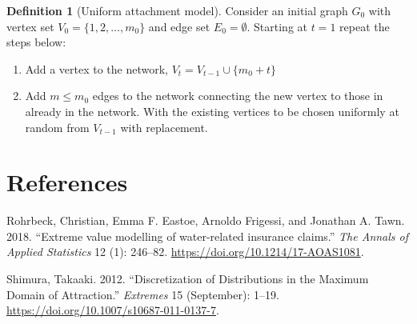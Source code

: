 \documentclass[
  10pt,
  a4paper,
]{scrreprt}
\providecommand{\tightlist}{%
  \setlength{\itemsep}{0pt}\setlength{\parskip}{0pt}}\usepackage{longtable,booktabs,array}
\newlength{\cslhangindent}
\newlength{\cslentryspacingunit} %
\newenvironment{CSLReferences}[2] %
 {%
  \setlength{\parindent}{0pt}
  \ifodd #1
  \let\oldpar\par
  \def\par{\hangindent=\cslhangindent\oldpar}
  \fi
  \setlength{\parskip}{#2\cslentryspacingunit}
 }%
 {}
\theoremstyle{definition}
\newtheorem{definition}{Definition}[section]
\theoremstyle{remark}
\begin{document}
{\begin{definition}[Uniform attachment
model]
Consider an initial graph \(G_0\) with vertex set
\(V_0=\{1,2,\ldots,m_0\}\) and edge set \(E_0=\emptyset\). Starting at
\(t=1\) repeat the steps below:

\begin{enumerate}
\def\labelenumi{\arabic{enumi}.}
\tightlist
\item
  Add a vertex to the network, \(V_t=V_{t-1}\cup\{m_0+t\}\)
\item
  Add \(m\le m_0\) edges to the network connecting the new vertex to
  those in already in the network. With the existing vertices to be
  chosen uniformly at random from \(V_{t-1}\) with replacement.
\end{enumerate}

\end{definition}

\newpage{}

\hypertarget{references}{%
\chapter*{References}\label{references}}

\hypertarget{refs}{}
\begin{CSLReferences}{1}{0}
\leavevmode{}%
Rohrbeck, Christian, Emma F. Eastoe, Arnoldo Frigessi, and Jonathan A.
Tawn. 2018. {``{Extreme value modelling of water-related insurance
claims}.''} \emph{The Annals of Applied Statistics} 12 (1): 246--82.
\url{https://doi.org/10.1214/17-AOAS1081}.

\leavevmode{}%
Shimura, Takaaki. 2012. {``Discretization of Distributions in the
Maximum Domain of Attraction.''} \emph{Extremes} 15 (September): 1--19.
\url{https://doi.org/10.1007/s10687-011-0137-7}.

\end{CSLReferences}
\end{document}
